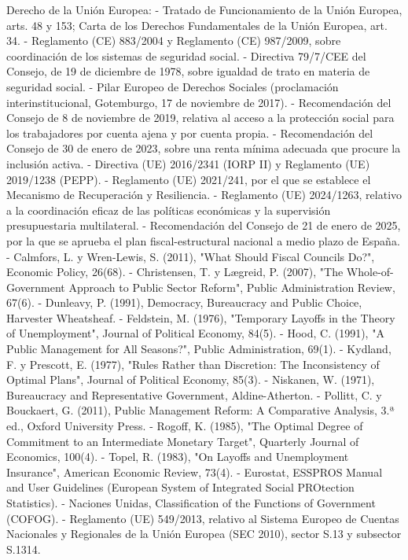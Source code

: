 \documentclass[10pt,a4paper]{article}
\begin{document}
Derecho de la Unión Europea:
- Tratado de Funcionamiento de la Unión Europea, arts. 48 y 153; Carta de los Derechos Fundamentales de la Unión Europea, art. 34.
- Reglamento (CE) 883/2004 y Reglamento (CE) 987/2009, sobre coordinación de los sistemas de seguridad social.
- Directiva 79/7/CEE del Consejo, de 19 de diciembre de 1978, sobre igualdad de trato en materia de seguridad social.
- Pilar Europeo de Derechos Sociales (proclamación interinstitucional, Gotemburgo, 17 de noviembre de 2017).
- Recomendación del Consejo de 8 de noviembre de 2019, relativa al acceso a la protección social para los trabajadores por cuenta ajena y por cuenta propia.
- Recomendación del Consejo de 30 de enero de 2023, sobre una renta mínima adecuada que procure la inclusión activa.
- Directiva (UE) 2016/2341 (IORP II) y Reglamento (UE) 2019/1238 (PEPP).
- Reglamento (UE) 2021/241, por el que se establece el Mecanismo de Recuperación y Resiliencia.
- Reglamento (UE) 2024/1263, relativo a la coordinación eficaz de las políticas económicas y la supervisión presupuestaria multilateral.
- Recomendación del Consejo de 21 de enero de 2025, por la que se aprueba el plan fiscal-estructural nacional a medio plazo de España.
- Calmfors, L. y Wren-Lewis, S. (2011), "What Should Fiscal Councils Do?", Economic Policy, 26(68).
- Christensen, T. y Lægreid, P. (2007), "The Whole-of-Government Approach to Public Sector Reform", Public Administration Review, 67(6).
- Dunleavy, P. (1991), Democracy, Bureaucracy and Public Choice, Harvester Wheatsheaf.
- Feldstein, M. (1976), "Temporary Layoffs in the Theory of Unemployment", Journal of Political Economy, 84(5).
- Hood, C. (1991), "A Public Management for All Seasons?", Public Administration, 69(1).
- Kydland, F. y Prescott, E. (1977), "Rules Rather than Discretion: The Inconsistency of Optimal Plans", Journal of Political Economy, 85(3).
- Niskanen, W. (1971), Bureaucracy and Representative Government, Aldine-Atherton.
- Pollitt, C. y Bouckaert, G. (2011), Public Management Reform: A Comparative Analysis, 3.ª ed., Oxford University Press.
- Rogoff, K. (1985), "The Optimal Degree of Commitment to an Intermediate Monetary Target", Quarterly Journal of Economics, 100(4).
- Topel, R. (1983), "On Layoffs and Unemployment Insurance", American Economic Review, 73(4).
- Eurostat, ESSPROS Manual and User Guidelines (European System of Integrated Social PROtection Statistics).
- Naciones Unidas, Classification of the Functions of Government (COFOG).
- Reglamento (UE) 549/2013, relativo al Sistema Europeo de Cuentas Nacionales y Regionales de la Unión Europea (SEC 2010), sector S.13 y subsector S.1314.
\end{document}
